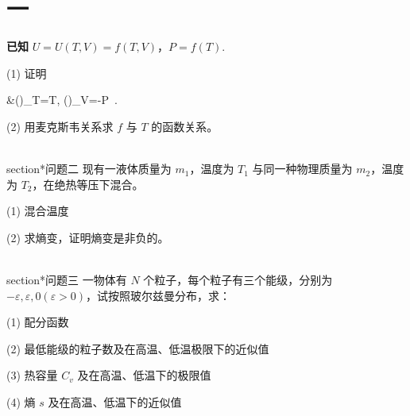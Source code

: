 \section{一}\textbf{已知} $U = U(T, V) = f(T, V)$，$P = f(T)$.

(1) 证明

&\left(\right)_T=T, \left(\right)_V=-P~.

(2) 用麦克斯韦关系求 $f$ 与 $T$ 的函数关系。

\\section*{问题二}
现有一液体质量为 $m_1$，温度为 $T_1$ 与同一种物理质量为 $m_2$，温度为 $T_2$，在绝热等压下混合。

(1) 混合温度

(2) 求熵变，证明熵变是非负的。

\\section*{问题三}
一物体有 $N$ 个粒子，每个粒子有三个能级，分别为 $-\varepsilon, \varepsilon, 0 (\varepsilon > 0)$，试按照玻尔兹曼分布，求：

(1) 配分函数

(2) 最低能级的粒子数及在高温、低温极限下的近似值

(3) 热容量 $C_v$ 及在高温、低温下的极限值

(4) 熵 $s$ 及在高温、低温下的近似值